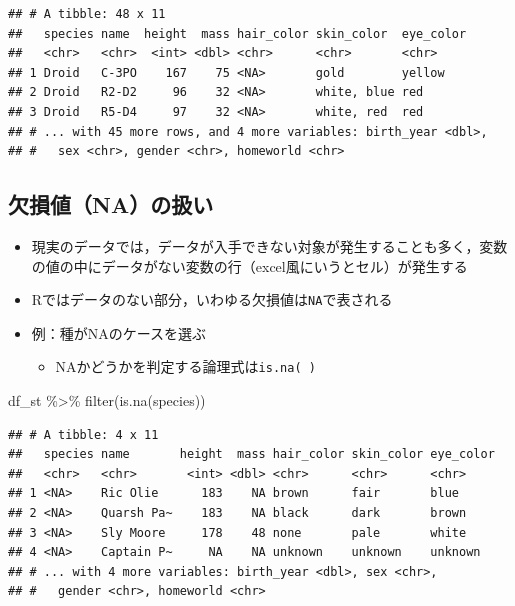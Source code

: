 \documentclass[
  xelatex,ja=standard, b5paper]{bxjsbook}
\newenvironment{Shaded}{\begin{snugshade}}{\end{snugshade}}
\newcommand{\FunctionTok}[1]{\textcolor[rgb]{0.00,0.00,0.00}{#1}}
\newcommand{\NormalTok}[1]{#1}
\newcommand{\SpecialCharTok}[1]{\textcolor[rgb]{0.00,0.00,0.00}{#1}}
\providecommand{\tightlist}{%
  \setlength{\itemsep}{0pt}\setlength{\parskip}{0pt}}
\begin{document}
\begin{verbatim}
## # A tibble: 48 x 11
##   species name  height  mass hair_color skin_color  eye_color
##   <chr>   <chr>  <int> <dbl> <chr>      <chr>       <chr>    
## 1 Droid   C-3PO    167    75 <NA>       gold        yellow   
## 2 Droid   R2-D2     96    32 <NA>       white, blue red      
## 3 Droid   R5-D4     97    32 <NA>       white, red  red      
## # ... with 45 more rows, and 4 more variables: birth_year <dbl>,
## #   sex <chr>, gender <chr>, homeworld <chr>
\end{verbatim}

\hypertarget{filter-st-na}{%
\subsection{欠損値（NA）の扱い}\label{filter-st-na}}

\begin{itemize}
\item
  現実のデータでは，データが入手できない対象が発生することも多く，変数の値の中にデータがない変数の行（excel風にいうとセル）が発生する
\item
  Rではデータのない部分，いわゆる欠損値は\texttt{NA}で表される
\item
  例：種がNAのケースを選ぶ

  \begin{itemize}
  \tightlist
  \item
    NAかどうかを判定する論理式は\texttt{is.na(\ )}
  \end{itemize}
\end{itemize}

\begin{Shaded}
\begin{Highlighting}[]
\NormalTok{df\_st }\SpecialCharTok{\%\textgreater{}\%} 
  \FunctionTok{filter}\NormalTok{(}\FunctionTok{is.na}\NormalTok{(species))}
\end{Highlighting}
\end{Shaded}

\begin{verbatim}
## # A tibble: 4 x 11
##   species name       height  mass hair_color skin_color eye_color
##   <chr>   <chr>       <int> <dbl> <chr>      <chr>      <chr>    
## 1 <NA>    Ric Olie      183    NA brown      fair       blue     
## 2 <NA>    Quarsh Pa~    183    NA black      dark       brown    
## 3 <NA>    Sly Moore     178    48 none       pale       white    
## 4 <NA>    Captain P~     NA    NA unknown    unknown    unknown  
## # ... with 4 more variables: birth_year <dbl>, sex <chr>,
## #   gender <chr>, homeworld <chr>
\end{verbatim}
\end{document}

